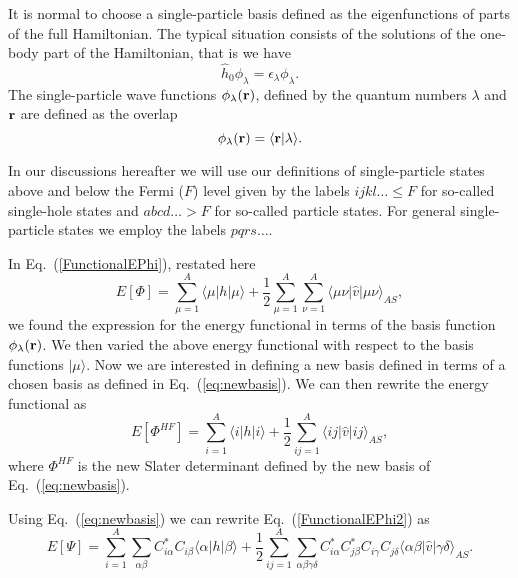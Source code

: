 \documentclass[%
twoside,                 %
final,                   %
10pt]{article}
\begin{document}
It is normal to choose a single-particle basis defined as the eigenfunctions
of parts of the full Hamiltonian. The typical situation consists of the solutions of the one-body part of the Hamiltonian, that is we have
\[
\hat{h}_0\phi_{\lambda}=\epsilon_{\lambda}\phi_{\lambda}.
\]
The single-particle wave functions $\phi_{\lambda}({\bf r})$, defined by the quantum numbers $\lambda$ and ${\bf r}$
are defined as the overlap 
\[
   \phi_{\lambda}({\bf r})  = \langle {\bf r} | \lambda \rangle .
\]




In our discussions hereafter we will use our definitions of single-particle states above and below the Fermi ($F$) level given by the labels
$ijkl\dots \le F$ for so-called single-hole states and $abcd\dots > F$ for so-called particle states.
For general single-particle states we employ the labels $pqrs\dots$. 




In Eq.~(\ref{FunctionalEPhi}), restated here
\[
  E[\Phi] 
  = \sum_{\mu=1}^A \langle \mu | h | \mu \rangle +
  \frac{1}{2}\sum_{{\mu}=1}^A\sum_{{\nu}=1}^A \langle \mu\nu|\hat{v}|\mu\nu\rangle_{AS},
\]
we found the expression for the energy functional in terms of the basis function $\phi_{\lambda}({\bf r})$. We then  varied the above energy functional with respect to the basis functions $|\mu \rangle$. 
Now we are interested in defining a new basis defined in terms of
a chosen basis as defined in Eq.~(\ref{eq:newbasis}). We can then rewrite the energy functional as
\begin{equation}
  E[\Phi^{HF}] 
  = \sum_{i=1}^A \langle i | h | i \rangle +
  \frac{1}{2}\sum_{ij=1}^A\langle ij|\hat{v}|ij\rangle_{AS}, \label{FunctionalEPhi2}
\end{equation}
where $\Phi^{HF}$ is the new Slater determinant defined by the new basis of Eq.~(\ref{eq:newbasis}). 





Using Eq.~(\ref{eq:newbasis}) we can rewrite Eq.~(\ref{FunctionalEPhi2}) as 
\begin{equation}
  E[\Psi] 
  = \sum_{i=1}^A \sum_{\alpha\beta} C^*_{i\alpha}C_{i\beta}\langle \alpha | h | \beta \rangle +
  \frac{1}{2}\sum_{ij=1}^A\sum_{{\alpha\beta\gamma\delta}} C^*_{i\alpha}C^*_{j\beta}C_{i\gamma}C_{j\delta}\langle \alpha\beta|\hat{v}|\gamma\delta\rangle_{AS}. \label{FunctionalEPhi3}
\end{equation}
\end{document}
